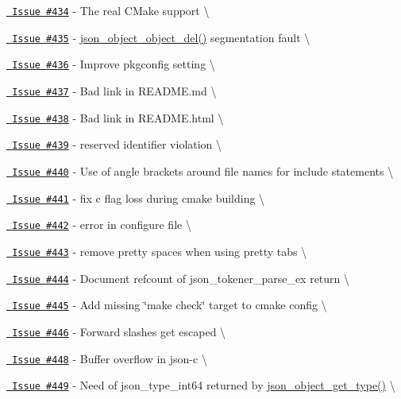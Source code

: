 \begin{DoxyItemize}
\item \href{https://github.com/json-c/json-c/issues/434}{\texttt{ Issue \#434}} -\/ The real CMake support \textbackslash{}
\item \href{https://github.com/json-c/json-c/issues/435}{\texttt{ Issue \#435}} -\/ \mbox{\hyperlink{json__object_8h_ac6605fdafca20bd5d33c84f4f80a3bda}{json\+\_\+object\+\_\+object\+\_\+del()}} segmentation fault \textbackslash{}
\item \href{https://github.com/json-c/json-c/issues/436}{\texttt{ Issue \#436}} -\/ Improve pkgconfig setting \textbackslash{}
\item \href{https://github.com/json-c/json-c/issues/437}{\texttt{ Issue \#437}} -\/ Bad link in README.\+md \textbackslash{}
\item \href{https://github.com/json-c/json-c/issues/438}{\texttt{ Issue \#438}} -\/ Bad link in README.\+html \textbackslash{}
\item \href{https://github.com/json-c/json-c/issues/439}{\texttt{ Issue \#439}} -\/ reserved identifier violation \textbackslash{}
\item \href{https://github.com/json-c/json-c/issues/440}{\texttt{ Issue \#440}} -\/ Use of angle brackets around file names for include statements \textbackslash{}
\item \href{https://github.com/json-c/json-c/issues/441}{\texttt{ Issue \#441}} -\/ fix c flag loss during cmake building \textbackslash{}
\item \href{https://github.com/json-c/json-c/issues/442}{\texttt{ Issue \#442}} -\/ error in configure file \textbackslash{}
\item \href{https://github.com/json-c/json-c/issues/443}{\texttt{ Issue \#443}} -\/ remove pretty spaces when using pretty tabs \textbackslash{}
\item \href{https://github.com/json-c/json-c/issues/444}{\texttt{ Issue \#444}} -\/ Document refcount of json\+\_\+tokener\+\_\+parse\+\_\+ex return \textbackslash{}
\item \href{https://github.com/json-c/json-c/issues/445}{\texttt{ Issue \#445}} -\/ Add missing \char`\"{}make check\char`\"{} target to cmake config \textbackslash{}
\item \href{https://github.com/json-c/json-c/issues/446}{\texttt{ Issue \#446}} -\/ Forward slashes get escaped \textbackslash{}
\item \href{https://github.com/json-c/json-c/issues/448}{\texttt{ Issue \#448}} -\/ Buffer overflow in json-\/c \textbackslash{}
\item \href{https://github.com/json-c/json-c/issues/449}{\texttt{ Issue \#449}} -\/ Need of json\+\_\+type\+\_\+int64 returned by \mbox{\hyperlink{json__object_8h_af256a3a7910e271a2b9735e5044c3827}{json\+\_\+object\+\_\+get\+\_\+type()}} \textbackslash{}

\end{DoxyItemize}
